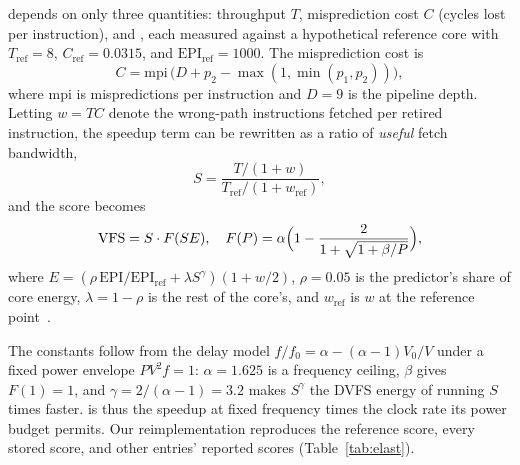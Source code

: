 \documentclass[conference]{IEEEtran}
\newcommand{\vfs}{\text{VFS}}
\newcommand{\epi}{\text{EPI}}
\begin{document}
\vfs{} depends on only three quantities: throughput $T$,
misprediction cost $C$ (cycles lost per instruction), and \epi{}, each measured
against a hypothetical reference core with $T_\text{ref}=8$,
$C_\text{ref}=0.0315$, and $\epi{}_\text{ref}=1000$. The misprediction cost is
\begin{equation}
C = \text{mpi}\,\bigl(D + p_2 - \max(1,\min(p_1,p_2))\bigr),
\label{eq:cpi}
\end{equation}
where $\text{mpi}$ is mispredictions per instruction and $D=9$ is the pipeline
depth. Letting $w=TC$ denote the wrong-path
instructions fetched per retired instruction, the speedup term can be rewritten
as a ratio of \emph{useful} fetch bandwidth,
\begin{equation}
S = \frac{T/(1+w)}{T_\text{ref}/(1+w_\text{ref})},
\label{eq:speedup}
\end{equation}
and the score becomes
\begin{equation}
\vfs{} = S\cdot F(SE),\quad
F(P)=\alpha\Bigl(1-\frac{2}{1+\sqrt{1+\beta/P}}\Bigr),
\label{eq:vfs}
\end{equation}
where $E=(\rho\,\epi{}/\epi{}_\text{ref}+\lambda S^{\gamma})(1+w/2)$,
$\rho=0.05$ is the predictor's share of core energy, $\lambda=1-\rho$ is the
rest of the core's, and $w_\text{ref}$ is $w$ at the reference
point~\cite{vfsmetric}.

The constants follow from the delay model $f/f_0=\alpha-(\alpha-1)V_0/V$ under a
fixed power envelope $PV^2f=1$: $\alpha=1.625$ is a frequency ceiling, $\beta$
gives $F(1)=1$, and $\gamma=2/(\alpha-1)=3.2$ makes $S^\gamma$ the DVFS energy of
running $S$ times faster. \vfs{} is thus the speedup at fixed frequency times
the clock rate its power budget permits. Our reimplementation reproduces the
reference score, every stored score, and other entries' reported scores
(Table~\ref{tab:elast}).
\end{document}
